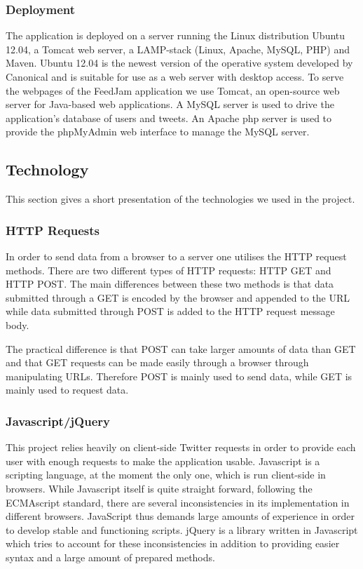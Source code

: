 \subsubsection{Deployment}
The application is deployed on a server running the Linux distribution Ubuntu 12.04, a Tomcat web server, a LAMP-stack (Linux, Apache, MySQL, PHP) and Maven. Ubuntu 12.04 is the newest version of the operative system developed by Canonical and is suitable for use as a web server with desktop access. To serve the webpages of the FeedJam application we use Tomcat, an open-source web server for Java-based web applications. A MySQL server is used to drive the application's database of users and tweets. An Apache php server is used to provide the phpMyAdmin web interface to manage the MySQL server.

\subsection{Technology}
This section gives a short presentation of the technologies we used in the project. 

\subsubsection{HTTP Requests}
In order to send data from a browser to a server one utilises the HTTP request methods. There are two different types of HTTP requests: HTTP GET and HTTP POST. The main differences between these two methods is that data submitted through a GET is encoded by the browser and appended to the URL while data submitted through POST is added to the HTTP request message body.

The practical difference is that POST can take larger amounts of data than GET and that GET requests can be made easily through a browser through manipulating URLs. Therefore POST is mainly used to send data, while GET is mainly used to request data.

\subsubsection{Javascript/jQuery} %
This project relies heavily on client-side Twitter requests in order to provide each user with enough requests to make the application usable. Javascript is a scripting language, at the moment the only one, which is run client-side in browsers. While Javascript itself is quite straight forward, following the ECMAscript standard, there are several inconsistencies in its implementation in different browsers. JavaScript thus demands large amounts of experience in order to develop stable and functioning scripts. jQuery is a library written in Javascript which tries to account for these inconsistencies in addition to providing easier syntax and a large amount of prepared methods.

